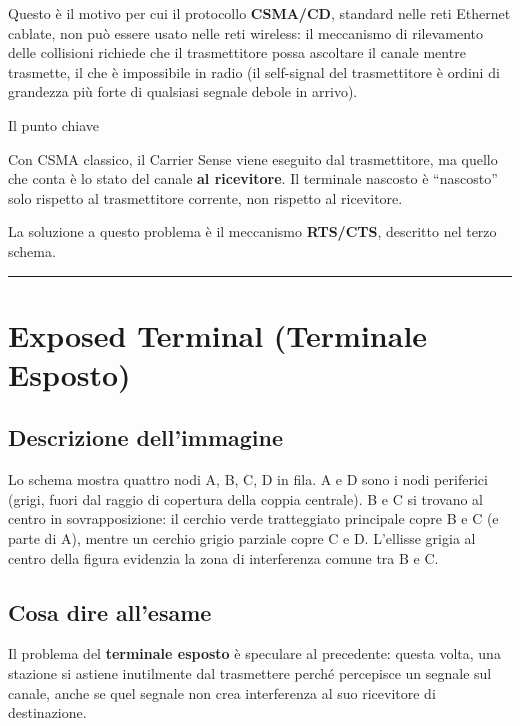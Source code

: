 \documentclass[
  italian,
  openany]{book}
\begin{document}
Questo è il motivo per cui il protocollo \textbf{CSMA/CD}, standard
nelle reti Ethernet cablate, non può essere usato nelle reti wireless:
il meccanismo di rilevamento delle collisioni richiede che il
trasmettitore possa ascoltare il canale mentre trasmette, il che è
impossibile in radio (il self-signal del trasmettitore è ordini di
grandezza più forte di qualsiasi segnale debole in arrivo).

\begin{callouttip}{Il punto chiave}

Con CSMA classico, il Carrier Sense viene eseguito dal trasmettitore, ma
quello che conta è lo stato del canale \textbf{al ricevitore}. Il
terminale nascosto è ``nascosto'' solo rispetto al trasmettitore
corrente, non rispetto al ricevitore.

\end{callouttip}

La soluzione a questo problema è il meccanismo \textbf{RTS/CTS},
descritto nel terzo schema.

\begin{center}\rule{0.5\linewidth}{0.5pt}\end{center}

\section{Exposed Terminal (Terminale
Esposto)}\label{exposed-terminal-terminale-esposto}

\subsection{Descrizione dell'immagine}\label{descrizione-dellimmagine-1}

Lo schema mostra quattro nodi A, B, C, D in fila. A e D sono i nodi
periferici (grigi, fuori dal raggio di copertura della coppia centrale).
B e C si trovano al centro in sovrapposizione: il cerchio verde
tratteggiato principale copre B e C (e parte di A), mentre un cerchio
grigio parziale copre C e D. L'ellisse grigia al centro della figura
evidenzia la zona di interferenza comune tra B e C.

\subsection{Cosa dire all'esame}\label{cosa-dire-allesame-1}

Il problema del \textbf{terminale esposto} è speculare al precedente:
questa volta, una stazione si astiene inutilmente dal trasmettere perché
percepisce un segnale sul canale, anche se quel segnale non crea
interferenza al suo ricevitore di destinazione.
\end{document}
